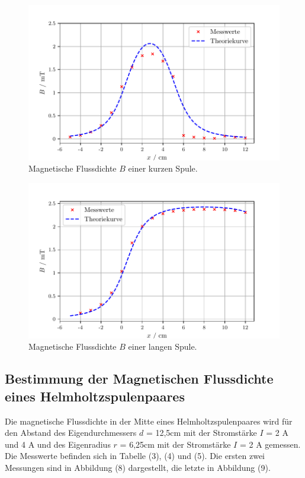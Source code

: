 \begin{figure}[H]
  \centering
  \includegraphics{kurz.pdf}
  \caption{Magnetische Flussdichte $B$ einer kurzen Spule.}
  \label{fig:plot}
\end{figure}
\begin{figure}[H]
  \centering
  \includegraphics{lang.pdf}
  \caption{Magnetische Flussdichte $B$ einer langen Spule.}
  \label{fig:plot}
\end{figure}

\subsection{Bestimmung der Magnetischen Flussdichte eines Helmholtzspulenpaares}
Die magnetische Flussdichte in der Mitte eines Helmholtzspulenpaares wird für den Abstand 
des Eigendurchmessers $d$ = 12,5cm mit der Stromstärke $I$ = 2 A und 4 A und des 
Eigenradius $r$ = 6,25cm mit der Stromstärke $I$ = 2 A gemessen.
Die Messwerte befinden sich in Tabelle (3), (4) und (5). Die ersten zwei Messungen sind in
Abbildung (8) dargestellt, die letzte in Abbildung (9).

